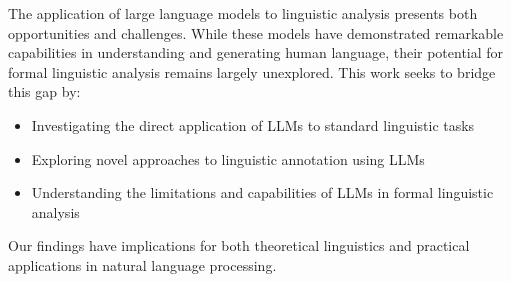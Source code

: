 The application of large language models to linguistic analysis presents both opportunities and challenges. While these models have demonstrated remarkable capabilities in understanding and generating human language, their potential for formal linguistic analysis remains largely unexplored. This work seeks to bridge this gap by:

\begin{itemize}
    \item Investigating the direct application of LLMs to standard linguistic tasks
    \item Exploring novel approaches to linguistic annotation using LLMs
    \item Understanding the limitations and capabilities of LLMs in formal linguistic analysis
\end{itemize}

Our findings have implications for both theoretical linguistics and practical applications in natural language processing. 